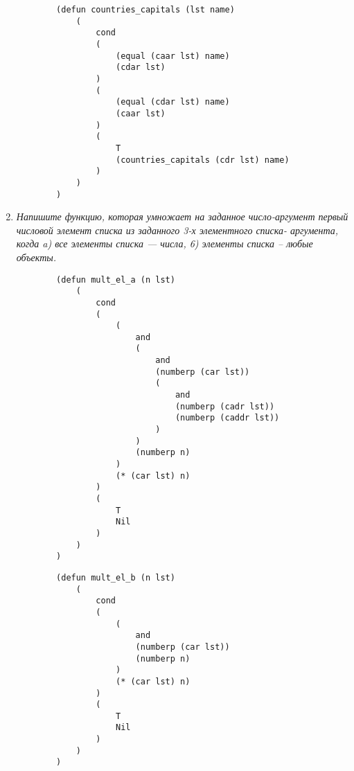 \begin{enumerate}[wide=0pt]
	\begin{lstlisting}
		(defun countries_capitals (lst name)
			(
				cond 
				(
					(equal (caar lst) name)
					(cdar lst)
				)
				(
					(equal (cdar lst) name)
					(caar lst)
				)
				(
					T
					(countries_capitals (cdr lst) name)
				)
			)
		)
	\end{lstlisting}



	\item  \textit{Напишите функцию, которая умножает на заданное число-аргумент
	первый числовой элемент списка из заданного 3-х элементного списка-
	аргумента, когда
	a) все элементы списка --- числа,
	6) элементы списка -- любые объекты.}

	\begin{lstlisting}
		(defun mult_el_a (n lst)
			(
				cond 
				(
					(
						and
						(
							and
							(numberp (car lst))
							(
								and
								(numberp (cadr lst))
								(numberp (caddr lst))
							)
						)
						(numberp n)
					)
					(* (car lst) n)
				)
				(
					T 
					Nil
				)
			)
		)
	\end{lstlisting}


	\begin{lstlisting}
		(defun mult_el_b (n lst)
			(
				cond 
				(
					(
						and
						(numberp (car lst))
						(numberp n)
					)
					(* (car lst) n)
				)
				(
					T 
					Nil
				)
			)
		)
	\end{lstlisting}

\end{enumerate}